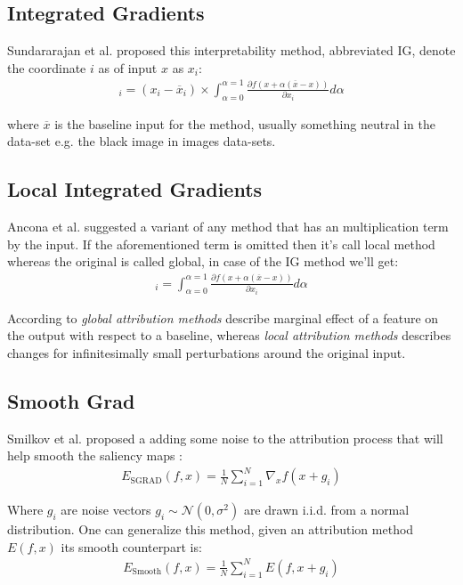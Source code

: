 \documentclass[12pt]{report}
\begin{document}
\subsection{Integrated Gradients}
Sundararajan et al. \cite{DBLP:journals/corr/SundararajanTY17} proposed this interpretability method, abbreviated IG, denote the coordinate $i$ as of input $x$ as $x_i$: 
\begin{align*}
	[E_\text{IG}(f, x)]_i  = (x_i - \overline{x}_i) \times \int_{\alpha=0}^{\alpha=1}\frac{\partial f(x+ \alpha(\overline{x}-x ))}{\partial x_i} d \alpha
\end{align*}

where $\overline{x}$ is the baseline input for the method, usually something neutral in the data-set e.g. the black image in images data-sets.

\subsection{Local Integrated Gradients}
Ancona et al. \cite{https://doi.org/10.48550/arxiv.1711.06104} suggested a variant of any method that has an multiplication term by the input. If the aforementioned term is omitted then it's call local method whereas the original is called global, in case of the IG method we'll get:
\begin{align*}
	[E_\text{local-IG}(f, x)]_i  = \int_{\alpha=0}^{\alpha=1}\frac{\partial f(x+ \alpha(\overline{x}-x ))}{\partial x_i} d \alpha
\end{align*}

According to \cite{https://doi.org/10.48550/arxiv.1711.06104} \textit{global attribution methods} describe  marginal effect of a feature on the output
with respect to a baseline, whereas  \textit{local attribution methods} describes changes for infinitesimally small perturbations around the original input.\\

\subsection{Smooth Grad}

Smilkov et al. \cite{DBLP:journals/corr/SmilkovTKVW17} proposed a adding some noise to the attribution process that will help smooth the saliency maps :
\begin{align*}
	E_\text{SGRAD}(f, x)  = \frac{1}{N}\sum_{i=1}^{N}\nabla_{x}f(x+g_i)
\end{align*}

Where $g_i$ are noise vectors $g_i \sim \mathcal{N}(0, \sigma^2) $ are drawn i.i.d. from a normal distribution. One can generalize this method, given an attribution method $E(f, x)$ its smooth counterpart is:
\begin{align*}
	E_\text{Smooth}(f, x)  = \frac{1}{N}\sum_{i=1}^{N}E(f, x + g_i)
\end{align*}
\end{document}
